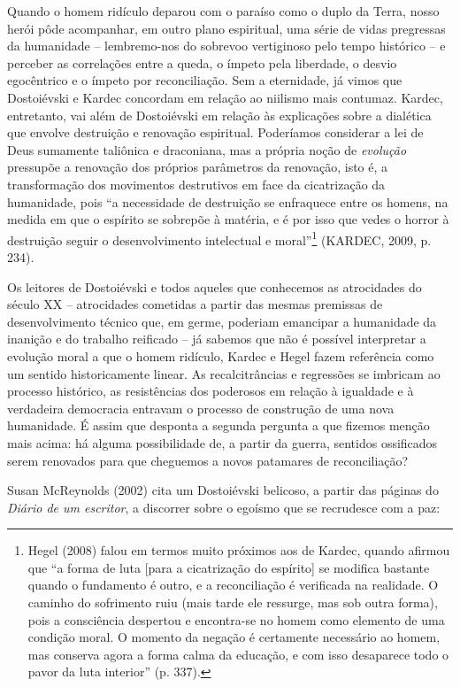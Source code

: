 Quando o homem ridículo deparou com o paraíso como o duplo da Terra,
nosso herói pôde acompanhar, em outro plano espiritual, uma série de
vidas pregressas da humanidade -- lembremo-nos do sobrevoo vertiginoso
pelo tempo histórico -- e perceber as correlações entre a queda, o
ímpeto pela liberdade, o desvio egocêntrico e o ímpeto por
reconciliação. Sem a eternidade, já vimos que Dostoiévski e Kardec
concordam em relação ao niilismo mais contumaz. Kardec, entretanto, vai
além de Dostoiévski em relação às explicações sobre a dialética que
envolve destruição e renovação espiritual. Poderíamos considerar a lei
de Deus sumamente taliônica e draconiana, mas a própria noção de
\emph{evolução} pressupõe a renovação dos próprios parâmetros da
renovação, isto é, a transformação dos movimentos destrutivos em face da
cicatrização da humanidade, pois ``a necessidade de destruição se
enfraquece entre os homens, na medida em que o espírito se sobrepõe à
matéria, e é por isso que vedes o horror à destruição seguir o
desenvolvimento intelectual e moral''\footnote{Hegel (2008) falou em
  termos muito próximos aos de Kardec, quando afirmou que ``a forma de
  luta {[}para a cicatrização do espírito{]} se modifica bastante quando
  o fundamento é outro, e a reconciliação é verificada na realidade. O
  caminho do sofrimento ruiu (mais tarde ele ressurge, mas sob outra
  forma), pois a consciência despertou e encontra-se no homem como
  elemento de uma condição moral. O momento da negação é certamente
  necessário ao homem, mas conserva agora a forma calma da educação, e
  com isso desaparece todo o pavor da luta interior'' (p. 337).}
(KARDEC, 2009, p. 234).

Os leitores de Dostoiévski e todos aqueles que conhecemos as atrocidades
do século XX -- atrocidades cometidas a partir das mesmas premissas de
desenvolvimento técnico que, em germe, poderiam emancipar a humanidade
da inanição e do trabalho reificado -- já sabemos que não é possível
interpretar a evolução moral a que o homem ridículo, Kardec e Hegel
fazem referência como um sentido historicamente linear. As
recalcitrâncias e regressões se imbricam ao processo histórico, as
resistências dos poderosos em relação à igualdade e à verdadeira
democracia entravam o processo de construção de uma nova humanidade. É
assim que desponta a segunda pergunta a que fizemos menção mais acima:
há alguma possibilidade de, a partir da guerra, sentidos ossificados
serem renovados para que cheguemos a novos patamares de reconciliação?

Susan McReynolds (2002) cita um Dostoiévski belicoso, a partir das
páginas do \emph{Diário de um escritor}, a discorrer sobre o egoísmo que
se recrudesce com a paz:

